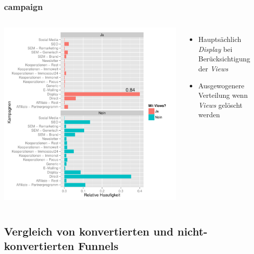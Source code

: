 \begin{frame}\frametitle{campaign}
	\begin{columns}
		\column{7cm}
			\includegraphics[scale=0.39]{campaignSucc.pdf}
		\column{4cm}
			\begin{itemize}
				\item Hauptsächlich \textit{Display} bei Berücksichtigung der \textit{Views}
				\item Ausgewogenere Verteilung wenn \textit{Views} gelöscht werden
			\end{itemize}
	\end{columns}
\end{frame}

\subsection{Vergleich von konvertierten und nicht-konvertierten Funnels}



